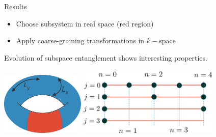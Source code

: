 \documentclass[aspectratio=169,t]{beamer}
\begin{document}
\begin{frame}{Results}

\begin{itemize}
	\item Choose subsystem in real space (red region)
	\item Apply \alert{coarse-graining transformations} in \(k-\)space
\end{itemize}

\vspace*{\fill}
Evolution of subspace entanglement shows interesting properties.

\vspace*{\fill}
\includegraphics[width=0.3\textwidth]{subsystem-torus.pdf}
\hspace*{\fill}
\includegraphics[width=0.5\textwidth]{coarse-graining.pdf}
\end{frame}
\end{document}

